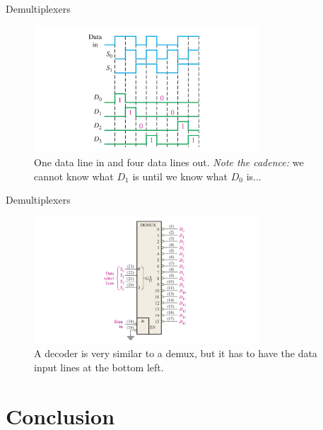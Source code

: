 \documentclass{beamer}
\begin{document}
\begin{frame}{Demultiplexers}
\begin{figure}
\centering
\includegraphics[width=0.75\textwidth,trim=3cm 0cm 3cm 0cm,clip=true]{figures/dmux2.pdf}
\caption{\label{fig:dmux2} One data line in and four data lines out.  \textit{Note the cadence:} we cannot know what $D_1$ is until we know what $D_0$ is...}
\end{figure}
\end{frame}

\begin{frame}{Demultiplexers}
\begin{figure}
\centering
\includegraphics[width=0.75\textwidth,trim=3cm 0cm 3cm 0cm,clip=true]{figures/dmux3.pdf}
\caption{\label{fig:dmux3} A decoder is very similar to a demux, but it has to have the data input lines at the bottom left.}
\end{figure}
\end{frame}

\section{Conclusion}
\end{document}
